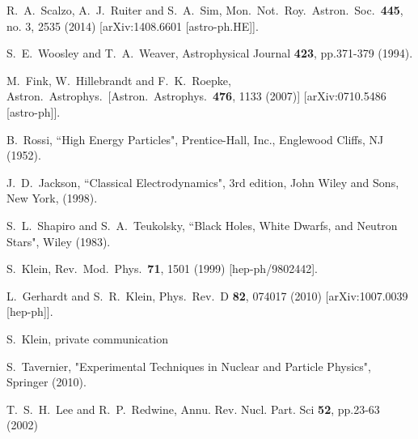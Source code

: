 \documentclass[twocolumn, preprintnumbers,amsmath,amssymb,prd, superscriptaddress]{revtex4}
\begin{document}
\begin{thebibliography}{99}
  R.~A.~Scalzo, A.~J.~Ruiter and S.~A.~Sim,
  Mon.\ Not.\ Roy.\ Astron.\ Soc.\  {\bf 445}, no. 3, 2535 (2014)
  [arXiv:1408.6601 [astro-ph.HE]].


  S.~E.~Woosley and T.~A.~Weaver, Astrophysical Journal {\bf 423}, pp.371-379 (1994).

  M.~Fink, W.~Hillebrandt and F.~K.~Roepke,
  Astron.\ Astrophys.\
  [Astron.\ Astrophys.\  {\bf 476}, 1133 (2007)]
  [arXiv:0710.5486 [astro-ph]].


B.~Rossi, ``High Energy Particles", Prentice-Hall, Inc., Englewood Cliffs, NJ (1952).

J.~D.~Jackson, ``Classical Electrodynamics", 3rd edition, John Wiley and Sons, New
York, (1998).

S.~L.~Shapiro and S.~A.~Teukolsky, ``Black Holes, White Dwarfs, and Neutron Stars", Wiley (1983).

  S.~Klein,
  Rev.\ Mod.\ Phys.\  {\bf 71}, 1501 (1999)
  [hep-ph/9802442].

  L.~Gerhardt and S.~R.~Klein,
  Phys.\ Rev.\ D {\bf 82}, 074017 (2010)
  [arXiv:1007.0039 [hep-ph]].

S.~Klein, private communication

S.~Tavernier, "Experimental Techniques in Nuclear and Particle Physics", Springer (2010).

T.~S.~H.~Lee and R.~P.~Redwine,
 Annu. Rev. Nucl. Part. Sci {\bf 52}, pp.23-63 (2002)


\end{thebibliography}
\end{document}
